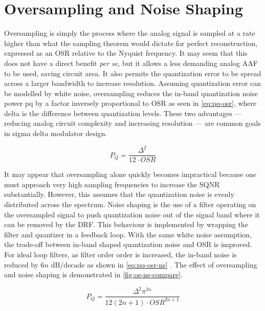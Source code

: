 \section{Oversampling and Noise Shaping}
\label{sec:in-os-ns}

Oversampling is simply the process where the analog signal is sampled at a rate higher than what the sampling theorem would dictate for perfect reconstruction, expressed as an \gls{OSR} relative to the Nyquist frequency. It may seem that this does not have a direct benefit \emph{per se}, but it allows a less demanding analog \gls{AAF} to be used, saving circuit area. It also permits the quantization error to be spread across a larger bandwidth to increase resolution. Assuming quantization error can be modelled by white noise, oversampling reduces the in-band quantization noise power \gls{pq} by a factor inversely proportional to \gls{OSR} \cite{DeLaRosa2011} as seen in \autoref{eq:pq-osr}, where \gls{delta} is the difference between quantization levels. These two advantages --- reducing analog circuit complexity and increasing resolution --- are common goals in sigma delta modulator design.

\begin{equation}
	P_Q = \frac{\Delta^2}{12 \cdot OSR} \label{eq:pq-osr}
\end{equation}

It may appear that oversampling alone quickly becomes impractical because one must approach very high sampling frequencies to increase the \gls{SQNR} substantially. However, this assumes that the quantization noise is evenly distributed across the spectrum. Noise shaping is the use of a filter operating on the oversampled signal to push quantization noise out of the signal band where it can be removed by the \gls{DRF}. This behaviour is implemented by wrapping the filter and quantizer in a feedback loop. With the same white noise assumption, the trade-off between in-band shaped quantization noise and \gls{OSR} is improved. For ideal loop filters, as filter order \gls{order} is increased, the in-band noise is reduced by $6n \textrm{ dB/decade}$ as shown in \autoref{eq:pq-osr-ns} \cite{DeLaRosa2011}. The effect of oversampling and noise shaping is demonstrated in \autoref{fig:os-ns-compare}. 

\begin{equation}
	P_Q = \frac{\Delta^2\pi^{2n}}{12\left(2n + 1\right) \cdot OSR^{2n + 1}} \label{eq:pq-osr-ns}
\end{equation}

